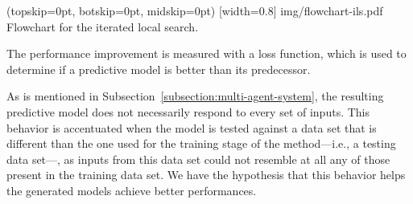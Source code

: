\documentclass{ieeeaccess}
\begin{document}
\Figure[](topskip=0pt, botskip=0pt, midskip=0pt)
[width=0.8\linewidth]
{img/flowchart-ils.pdf}
{Flowchart for the iterated local search.
  \label{figure:flowchart-ils}}

The performance improvement is measured with a loss function, which is used to determine if a predictive model is better than its predecessor. %




    


As is mentioned in Subsection~\ref{subsection:multi-agent-system}, the resulting predictive model does not necessarily respond to every set of inputs. This behavior is accentuated when the model is tested against a data set that is different than the one used for the training stage of the method---i.e., a testing data set---, as inputs from this data set could not resemble at all any of those present in the training data set. We have the hypothesis that this behavior helps the generated models achieve better performances.
\end{document}
